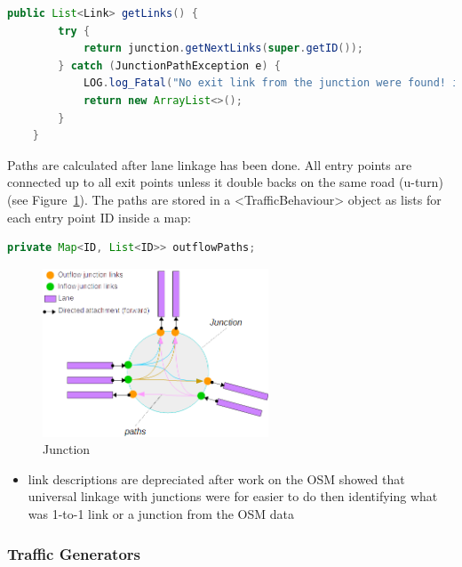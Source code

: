 \begin{lstlisting}[language=Java]
    public List<Link> getLinks() {
        try {
            return junction.getNextLinks(super.getID());
        } catch (JunctionPathException e) {
            LOG.log_Fatal("No exit link from the junction were found! i.e.: Car is stuck!");
            return new ArrayList<>();
        }
    }
\end{lstlisting}

Paths are calculated after lane linkage has been done. All entry points are connected up to all exit points unless it double backs on the same road (u-turn) (see Figure~\ref{fig:junction}). The paths are stored in a <TrafficBehaviour> object as lists for each entry point ID inside a map:

\begin{lstlisting}[language=Java]
	private Map<ID, List<ID>> outflowPaths;
\end{lstlisting}

\begin{figure}[!h]
	\vspace{1.5em}
  	\caption{Junction}
  	\label{fig:junction}
  	\centering
	\includegraphics[width=0.6\textwidth]{figs/graphConstruction/Junction.png}
  	\vspace{1.5em}
\end{figure}

\begin{itemize}
	\item link descriptions are depreciated after work on the OSM showed that universal linkage with junctions were for easier to do then identifying what was 1-to-1 link or a junction from the OSM data
\end{itemize}

\subsubsection{Traffic Generators}

